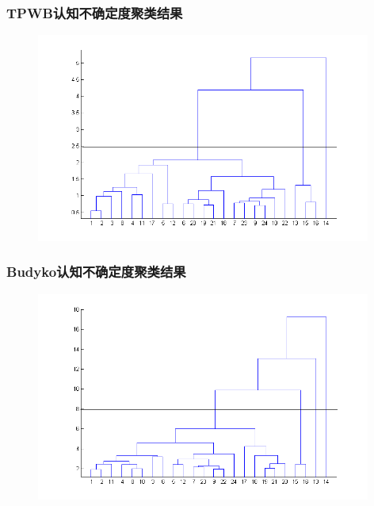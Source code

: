 \documentclass{beamer}
\begin{document}
\begin{CJK}{UTF8}{gkai}
\begin{frame}
\begin{figure}
\end{figure}
\end{frame}

 
 
\begin{frame}
\frametitle{TPWB认知不确定度聚类结果}
\begin{figure}
\centering
\includegraphics[width=11cm]{epTPWBu.png}
 
\end{figure}
\end{frame}

 

\begin{frame}
\frametitle{Budyko认知不确定度聚类结果}
\begin{figure}
\centering
\includegraphics[width=11cm]{epBudykou.png}
 
\end{figure}
\end{frame}

 

\end{CJK}
\end{document}
